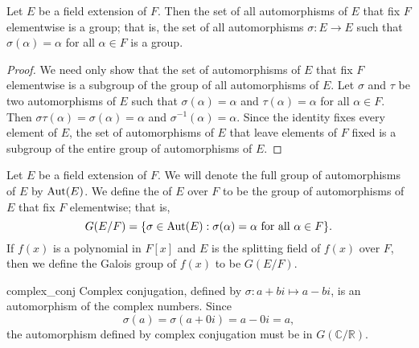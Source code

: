 \begin{proposition}
Let $E$ be a field extension of $F$.  Then the set of all automorphisms of $E$ that fix $F$ elementwise is a group; that is, the set of all automorphisms $\sigma : E \rightarrow E$ such that $\sigma( \alpha ) =
\alpha$ for all $\alpha \in F$ is a group.  
\end{proposition}

\begin{proof}
We need only show that the set of automorphisms of $E$ that fix $F$ elementwise is a subgroup of the group of all automorphisms of $E$.  Let $\sigma$ and $\tau$ be two automorphisms of $E$ such that $\sigma( \alpha ) = \alpha$ and $\tau( \alpha ) = \alpha$ for all $\alpha \in F$.  Then $\sigma \tau( \alpha ) = \sigma( \alpha) = \alpha$ and  $\sigma^{-1}( \alpha ) = \alpha$.   Since the identity fixes every  element of $E$, the set of automorphisms of $E$ that leave elements of  $F$ fixed is a subgroup of the entire group of automorphisms of $E$. 
\end{proof}

\medskip

Let $E$ be a field extension of $F$.  We will denote the full group of automorphisms of $E$ by $\operatorname{Aut}(E)$.  We define the  of $E$ over $F$ to be
the group of automorphisms of $E$ that fix $F$ elementwise; that is,
\[
G(E/F)\label{notegalois} = \{ \sigma \in \operatorname{Aut}(E) : \sigma(\alpha)
=
\alpha \mbox{ for all $\alpha \in F$} \}.
\]
If $f(x)$ is a polynomial in $F[x]$ and $E$ is the splitting field of $f(x)$ over $F$, then we define the Galois group of $f(x)$ to be $G(E/F)$. 


\begin{example}{complex_conj}
Complex conjugation, defined by $\sigma : a + bi \mapsto a - bi$, is an automorphism of the complex numbers.  Since 
\[
\sigma(a) = \sigma(a + 0i) = a - 0i = a,
\]
the automorphism defined by complex conjugation must be in $G( {\mathbb C} / {\mathbb R} )$. 
\end{example}


